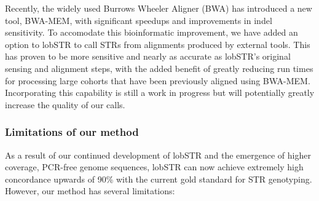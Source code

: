 Recently, the widely used Burrows Wheeler Aligner (BWA) \cite{LiDurbin2009a} has introduced a new tool, BWA-MEM, with significant speedups and improvements in indel sensitivity. To accomodate this bioinformatic improvement, we have added an option to lobSTR to call STRs from alignments produced by external tools. This has proven to be more sensitive and nearly as accurate as lobSTR's original sensing and alignment steps, with the added benefit of greatly reducing run times for processing large cohorts that have been previously aligned using BWA-MEM. Incorporating this capability is still a work in progress but will potentially greatly increase the quality of our calls.

\subsubsection{Limitations of our method}
As a result of our continued development of lobSTR and the emergence of higher coverage, PCR-free genome sequences, lobSTR can now achieve extremely high concordance upwards of 90\% with the current gold standard for STR genotyping. However, our method has several limitations:

